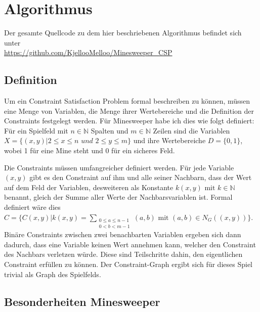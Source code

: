 %
\graphicspath{{chapters/images/}}
\section{Algorithmus}

Der gesamte Quellcode zu dem hier beschriebenen Algorithmus befindet sich unter\\
\url{https://github.com/KjellooMelloo/Minesweeper_CSP}

\subsection{Definition}

Um ein Constraint Satisfaction Problem formal beschreiben zu können, müssen eine Menge von Variablen, die Menge 
ihrer Wertebereiche und die Definition der Constraints festgelegt werden. Für Minesweeper habe ich dies wie folgt definiert:\\
Für ein Spielfeld mit $n\in \mathbb{N}$ Spalten und $m\in\mathbb{N}$ Zeilen sind
die Variablen\\
$X=\{(x, y) | 2\le x\le n  \textit{ und }  2\le y\le m\}$
und ihre Wertebereiche $D=\{0, 1\}$, wobei 1 für eine Mine steht und 0 für ein sicheres Feld.

Die Constraints müssen umfangreicher definiert werden. Für jede Variable $(x, y)$ gibt es den Constraint auf ihm und alle seiner 
Nachbarn, dass der Wert auf dem Feld der Variablen, desweiteren als Konstante $k(x, y) \text{ mit } k\in\mathbb{N}$ 
benannt, gleich der Summe aller Werte der Nachbarsvariablen ist. Formal definiert wäre dies\\
$C=\{C(x, y) | k(x, y) = \sum_{\substack{0\le a\le n-1\\0<b<m-1}}{(a, b)} \text{ mit } (a, b)\in N_G((x, y))\}$.\\
Binäre Constraints zwischen zwei benachbarten Variablen ergeben sich dann dadurch, dass eine Variable keinen Wert annehmen kann, 
welcher den Constraint des Nachbars verletzen würde. Diese sind Teilschritte dahin, den eigentlichen Constraint erfüllen zu können.
Der Constraint-Graph ergibt sich für dieses Spiel trivial als Graph des Spielfelds.

\subsection{Besonderheiten Minesweeper}

